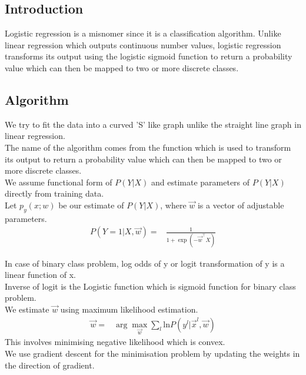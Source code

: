 \documentclass[12pt,letterpaper, onecolumn]{exam}
\begin{document}
\subsection*{Introduction}
Logistic regression is a misnomer since it is a classification algorithm. Unlike linear regression which outputs continuous number values, logistic regression transforms its output using the logistic sigmoid function to return a probability value which can then be mapped to two or more discrete classes.
\subsection*{Algorithm}
We try to fit the data into a curved 'S' like graph unlike the straight line graph in linear regression. \\
The name of the algorithm comes from the function which is used to transform its output to return a probability value which can then be mapped to two or more discrete classes. \\

We assume functional form of $P(Y|X)$ and estimate parameters of $P(Y|X)$ directly from training data.\\

Let $p_y(x;w)$ be our estimate of $P(Y|X)$, where $\vec{w}$ is a vector of adjustable parameters. \\

\begin{align}
P(Y=1|X,\vec{w}) = {}&\frac{1}{1+\exp{(-\vec{w}^\top X)}}
\end{align}

In case of binary class problem, log odds of y or logit transformation of y is a linear function of x.\\Inverse of logit is the Logistic function which is sigmoid function for binary class problem.\\ We estimate $\vec{w}$ using maximum likelihood estimation.
\begin{align}
\vec{w} = {}& \arg \max_{\vec{w}} \sum_{l} \text{ln} P(y^l|\vec{x}^l,\vec{w})
\end{align}
This involves minimising negative likelihood which is convex.\\
We use gradient descent for the minimisation problem by updating the weights in the direction of gradient.
\end{document}
